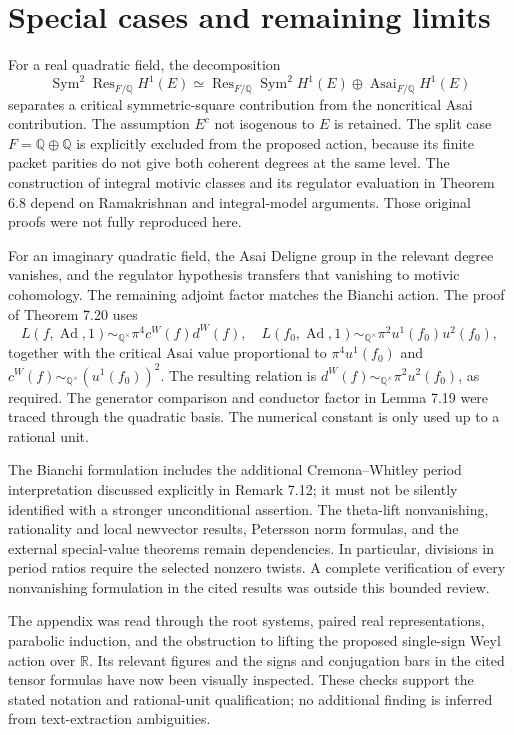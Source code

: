 \documentclass[10pt]{article}
\begin{document}
\section*{Special cases and remaining limits}
For a real quadratic field, the decomposition \[\operatorname{Sym}^2\operatorname{Res}_{F/\mathbb Q}H^1(E)
 \simeq \operatorname{Res}_{F/\mathbb Q}\operatorname{Sym}^2H^1(E)
       \oplus\operatorname{Asai}_{F/\mathbb Q}H^1(E)\] separates a critical symmetric-square contribution from the noncritical Asai contribution. The assumption \(E^c\) not isogenous to \(E\) is retained. The split case \(F=\mathbb Q\oplus\mathbb Q\) is explicitly excluded from the proposed action, because its finite packet parities do not give both coherent degrees at the same level. The construction of integral motivic classes and its regulator evaluation in Theorem 6.8 depend on Ramakrishnan and integral-model arguments. Those original proofs were not fully reproduced here.\par
For an imaginary quadratic field, the Asai Deligne group in the relevant degree vanishes, and the regulator hypothesis transfers that vanishing to motivic cohomology. The remaining adjoint factor matches the Bianchi action. The proof of Theorem 7.20 uses \[L(f,\operatorname{Ad},1)\sim_{\mathbb Q^\times}\pi^4c^W(f)d^W(f),\quad
 L(f_0,\operatorname{Ad},1)\sim_{\mathbb Q^\times}\pi^2u^1(f_0)u^2(f_0),\] together with the critical Asai value proportional to \(\pi^4u^1(f_0)\) and \(c^W(f)\sim_{\mathbb Q^\times}(u^1(f_0))^2\). The resulting relation is \(d^W(f)\sim_{\mathbb Q^\times}\pi^2u^2(f_0)\), as required. The generator comparison and conductor factor in Lemma 7.19 were traced through the quadratic basis. The numerical constant is only used up to a rational unit.\par
The Bianchi formulation includes the additional Cremona–Whitley period interpretation discussed explicitly in Remark 7.12; it must not be silently identified with a stronger unconditional assertion. The theta-lift nonvanishing, rationality and local newvector results, Petersson norm formulas, and the external special-value theorems remain dependencies. In particular, divisions in period ratios require the selected nonzero twists. A complete verification of every nonvanishing formulation in the cited results was outside this bounded review.\par
The appendix was read through the root systems, paired real representations, parabolic induction, and the obstruction to lifting the proposed single-sign Weyl action over \(\mathbb R\). Its relevant figures and the signs and conjugation bars in the cited tensor formulas have now been visually inspected. These checks support the stated notation and rational-unit qualification; no additional finding is inferred from text-extraction ambiguities.\par
\end{document}
